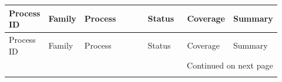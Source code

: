 
\begin{longtable}{@{}p{0.14\linewidth}p{0.12\linewidth}p{0.26\linewidth}p{0.15\linewidth}p{0.13\linewidth}p{0.12\linewidth}@{}}
\toprule
Process ID & Family & Process & Status & Coverage & Summary \\
\midrule
\endfirsthead
\toprule
Process ID & Family & Process & Status & Coverage & Summary \\
\midrule
\endhead
\midrule
\multicolumn{6}{r}{Continued on next page} \\
\midrule
\endfoot
\bottomrule
\endlastfoot


\end{longtable}

